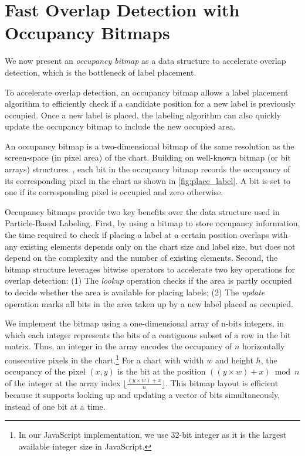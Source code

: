 \section{Fast Overlap Detection with Occupancy Bitmaps}

We now present an \emph{occupancy bitmap} as a data structure to accelerate overlap detection, which is the bottleneck of label placement.

To accelerate overlap detection, an occupancy bitmap allows a label placement algorithm to efficiently check if a candidate position for a new label is previously occupied.  
Once a new label is placed, the labeling algorithm can also quickly
update the occupancy bitmap to include the new occupied area. 

An occupancy bitmap is a two-dimensional bitmap of the same resolution as the screen-space (in pixel area) of the chart.
Building on well-known bitmap (or bit arrays) structures~\cite{wiki:bitarray}, each bit in the occupancy bitmap records the occupancy of its corresponding pixel in the chart as shown in
\autoref{fig:place_label}.
A bit is set to one if its corresponding pixel is occupied and zero otherwise.

Occupancy bitmaps provide two key benefits over the data structure used in Particle-Based Labeling.
First, by using a bitmap to store occupancy information, the time required to check if placing a label at a certain position overlaps with any existing elements depends only on the chart size and label size, but does not depend on the complexity and the number of existing elements.
Second, the bitmap structure leverages bitwise operators to accelerate two key operations for overlap detection: 
(1) The \emph{lookup} operation checks if the area is partly occupied to decide whether the area is available for placing labels;
(2) The \emph{update} operation marks all bits in the area taken up by a new label placed as occupied.

We implement the bitmap using a one-dimensional array of n-bits integers, in which each integer represents the bits of a contiguous subset of a row in the bit matrix.
Thus, an integer in the array encodes the occupancy of $n$ horizontally consecutive pixels in the chart.\footnote{In our JavaScript implementation, we use 32-bit integer as it is the largest available integer size in JavaScript.}
For a chart with width $w$ and height $h$, the occupancy of the pixel $(x, y)$
is the bit at the position $((y \times w) + x) \bmod n$ of the integer at the array index $\lfloor\frac{(y \times w) + x}{n}\rfloor$.
This bitmap layout is efficient because it supports looking up and updating a vector of bits simultaneously, instead of one bit at a time.

